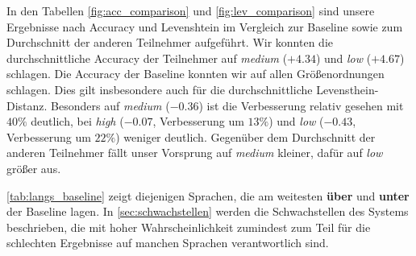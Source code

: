 \documentclass[11pt,a4paper]{article}
\begin{document}
In den Tabellen \ref{fig:acc_comparison} und \ref{fig:lev_comparison} sind unsere Ergebnisse nach Accuracy und Levenshtein im Vergleich zur Baseline sowie zum Durchschnitt der anderen Teilnehmer aufgeführt. Wir konnten die durchschnittliche Accuracy der Teilnehmer auf \textit{medium} ($+4.34$) und \textit{low} ($+4.67$) schlagen.
Die Accuracy der Baseline konnten wir auf allen Größenordnungen schlagen. Dies gilt insbesondere auch für die durchschnittliche Levensthein-Distanz.
Besonders auf \textit{medium} ($-0.36$) ist die Verbesserung relativ gesehen mit $40\%$ deutlich, bei \textit{high} ($-0.07$, Verbesserung um $13\%$) und \textit{low} ($-0.43$, Verbesserung um $22\%$) weniger deutlich.
Gegenüber dem Durchschnitt der anderen Teilnehmer fällt unser Vorsprung auf \textit{medium} kleiner, dafür auf \textit{low} größer aus.

\autoref{tab:langs_baseline} zeigt diejenigen Sprachen, die am weitesten \textbf{über} und \textbf{unter} der Baseline lagen. In \autoref{sec:schwachstellen} werden die Schwachstellen des Systems beschrieben, die mit hoher Wahrscheinlichkeit zumindest zum Teil für die schlechten Ergebnisse auf manchen Sprachen verantwortlich sind.
\end{document}
